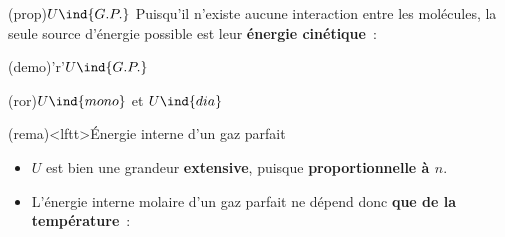 \documentclass[../../main/main.tex]{subfiles}
\begin{document}
\begin{tcbraster}[raster equal height=rows, raster columns=2]
	\begin{tcb*}(prop){$U\ind{G.P.}$}
		Puisqu'il n'existe aucune interaction entre les molécules, la seule source
		d'énergie possible est leur \textbf{énergie cinétique}~:
		\psw{%
			\[
				U = e_c + \underbracket[1pt]{e_p}_{=0}
				\Lra
				\boxed{U = \frac{D}{2} nRT}
				\quad
				R = k_B \Nc_A
			\]
		}%
		\vspace{-15pt}
	\end{tcb*}
	\begin{tcb*}(demo)'r'{$U\ind{G.P.}$}
		\vspace{-15pt}
	\end{tcb*}
\end{tcbraster}

\begin{tcb*}[sidebyside](ror){$U\ind{mono}$ et $U\ind{dia}$}
	\psw{%
		\[
			U\ind{mono} = \frac{3}{2}nRT
		\]
	}%
	\vspace{-15pt}
	\tcblower
	\psw{
		\[
			U\ind{dia} = \frac{5}{2}nRT
		\]
	}
	\vspace{-15pt}
\end{tcb*}

\begin{tcb}(rema)<lftt>{Énergie interne d'un gaz parfait}
	\begin{itemize}
		\item $U$ est bien une grandeur \textbf{extensive}, puisque
		      \textbf{proportionnelle à $n$}.
		\item L'énergie interne molaire d'un gaz parfait ne dépend donc \textbf{que
			      de la température}~:
		      \vspace{-15pt}
	\end{itemize}
\end{tcb}
\end{document}
